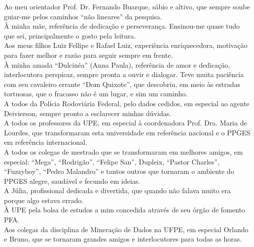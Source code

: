 Ao meu orientador Prof. Dr. Fernando Buarque, sábio e altivo, que sempre soube guiar-me pelos caminhos ``não lineares''  da pesquisa.\\

À minha mãe, referência de dedicação e perseverança. Ensinou-me quase tudo que sei, principalmente o gosto pela leitura.\\

Aos meus filhos Luiz Fellipe e Rafael Luiz, experiência enriquecedora, motivação para fazer melhor e razão para seguir sempre em frente.\\

À minha amada ``Dulcinéa'' (Anna Paula), referência de amor e dedicação, interlocutora perspicaz, sempre pronta a ouvir e dialogar. Teve muita paciência com seu cavaleiro errante ``Dom Quixote'', que descobriu, em meio às estradas tortuosas, que o fracasso não é um lugar, e sim um caminho.\\

A todos da Polícia Rodoviária Federal, pelo dados cedidos, em especial ao agente Deivierson,  sempre pronto a esclarecer minhas dúvidas.\\

A todos os professores da UPE, em especial à coordenadora Prof. Dra. Maria de Lourdes, que transformaram esta universidade em referência nacional e o PPGES em referência internacional.\\

A todos os colegas de mestrado que se transformaram em melhores amigos, em especial: ``Mega'', ``Rodrigão'', ``Felipe San'', Dupleix, ``Pastor Charles'', ``Fuzzyboy'', ``Pedro Malandro'' e tantos outros que tornaram o ambiente do PPGES alegre, saudável e fecundo em ideias.\\

A Júlia, profissional dedicada e divertida, que quando não falava muito era porque algo estava errado.\\

À UPE pela bolsa de estudos a mim concedida através de seu órgão de fomento PFA.\\

Aos colegas da disciplina de Mineração de Dados na UFPE, em especial Orlando e Bruno, que se tornaram grandes amigos e interlocutores para todas as horas.

